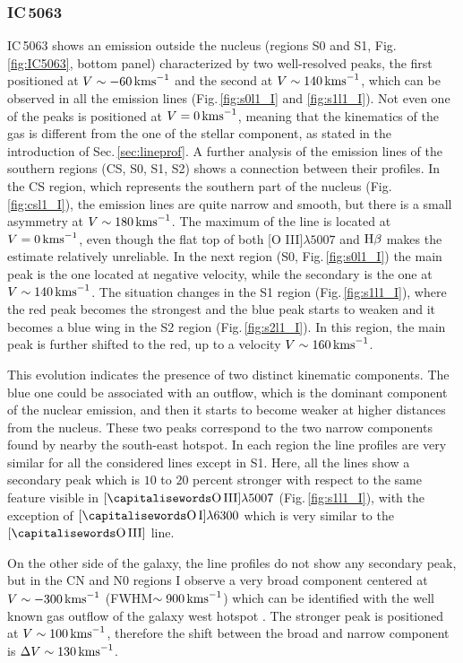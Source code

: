 \documentclass[../main.tex]{subfiles}
\begin{document}
\subsubsection{IC\,5063}


IC\,5063 shows an emission outside the nucleus (regions S0 and S1, Fig.\,\ref{fig:IC5063}, bottom panel) characterized by two well-resolved peaks, the first positioned at $V \sim -60\,\si{\kms}$ and the second at $V\sim 140\,\si{\kms}$, which can be observed in all the emission lines (Fig.\,\ref{fig:s0l1_I} and \ref{fig:s1l1_I}).
Not even one of the peaks is positioned at $V=0\,\si{\kms}$, meaning that the kinematics of the gas is different from the one of the stellar component, as stated in the introduction of Sec.\,\ref{sec:lineprof}.
A further analysis of the emission lines of the southern regions (CS, S0, S1, S2) shows a connection between their profiles.
In the CS region, which represents the southern part of the nucleus (Fig.\,\ref{fig:csl1_I}), the emission lines are quite narrow and smooth, but there is a small asymmetry at $V\sim 180\,\si{\kms}$.
The maximum of the line is located at $V=0\,\si{\kms}$, even though the flat top of both [O III]$\lambda5007$ and $\Hb$ makes the estimate relatively unreliable. 
In the next region (S0, Fig.\,\ref{fig:s0l1_I}) the main peak is the one located at negative velocity, while the secondary is the one at $V\sim 140\,\si{\kms}$.  
The situation changes in the S1 region (Fig.\,\ref{fig:s1l1_I}), where the red peak becomes the strongest and the blue peak starts to weaken and it becomes a blue wing in the S2 region (Fig.\,\ref{fig:s2l1_I}).
In this region, the main peak is further shifted to the red, up to a velocity $V \sim 160\,\si{\kms}$.

This evolution indicates the presence of two distinct kinematic components.
The blue one could be associated with an outflow, which is the dominant component of the nuclear emission, and then it starts to become weaker at higher distances from the nucleus.
These two peaks correspond to the two narrow components found by \citet{Morganti07} nearby the south-east hotspot.
In each region the line profiles are very similar for all the considered lines except in S1.
Here, all the lines show a secondary peak which is $10$ to $20$ percent stronger with respect to the same feature visible in $[\rm\ion{O}{III}]\lambda5007$  (Fig.\,\ref{fig:s1l1_I}), with the exception of $[\rm\ion{O}{I}]\lambda6300$ which is very similar to the $[\rm\ion{O}{III}]$ line.


On the other side of the galaxy, the line profiles do not show any secondary peak, but in the CN and N0 regions I observe a very broad component centered at $V\sim-300\,\si{\kms}$ (FWHM$\sim 900\,\si{\kms}$) which can be identified with the well known gas outflow of the galaxy west hotspot \citep[e.g.][]{Morganti07,Morganti15,Dasyra15}.
The stronger peak is positioned at $V\sim 100\,\si{\kms}$, therefore the shift between the broad and narrow component is $\Delta V \sim 130\,\si{\kms}$.
\end{document}
